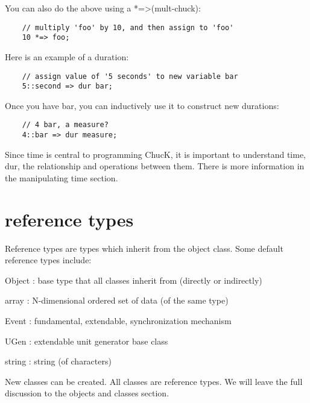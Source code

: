 You can also do the above using a *=\textgreater (mult-chuck):
\begin{verbatim}
    // multiply 'foo' by 10, and then assign to 'foo'
    10 *=> foo;
\end{verbatim}

Here is an example of a duration:
\begin{verbatim}
    // assign value of '5 seconds' to new variable bar
    5::second => dur bar;
\end{verbatim}

Once you have bar, you can inductively use it to construct new durations:
\begin{verbatim}
    // 4 bar, a measure?
    4::bar => dur measure;
\end{verbatim}

 Since time is central to programming ChucK, it is important to understand time, dur, the relationship and operations between them. There is more information in the manipulating time section.
 
\section{reference types}

Reference types are types which inherit from the object class. Some default reference types include:
\begin{chuckitemize}
\item  Object : base type that all classes inherit from (directly or indirectly)
\item  array : N-dimensional ordered set of data (of the same type)
\item  Event : fundamental, extendable, synchronization mechanism
\item  UGen : extendable unit generator base class
\item  string : string (of characters)
\end{chuckitemize}
 New classes can be created. All classes are reference types. We will leave the full discussion to the objects and classes section.
